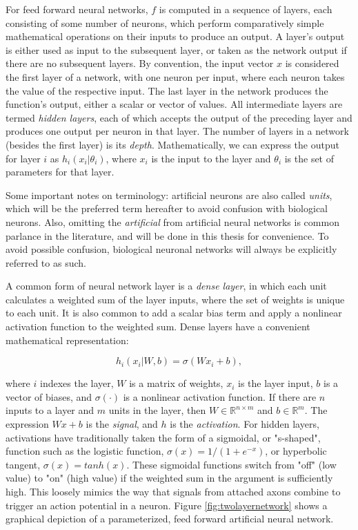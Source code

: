 For feed forward neural networks, $f$ is computed in a sequence of layers, each consisting of some number of neurons, which perform comparatively simple mathematical operations on their inputs to produce an output.
A layer's output is either used as input to the subsequent layer, or taken as the network output if there are no subsequent layers.
By convention, the input vector $x$ is considered the first layer of a network, with one neuron per input, where each neuron takes the value of the respective input.
The last layer in the network produces the function's output, either a scalar or vector of values.
All intermediate layers are termed \emph{hidden layers}, each of which accepts the output of the preceding layer and produces one output per neuron in that layer.
The number of layers in a network (besides the first layer) is its \emph{depth}.
Mathematically, we can express the output for layer $i$ as $h_i(x_i| \theta_i)$, where $x_i$ is the input to the layer and $\theta_i$ is the set of parameters for that layer.

Some important notes on terminology: artificial neurons are also called \emph{units}, which will be the preferred term hereafter to avoid confusion with biological neurons. Also, omitting the \emph{artificial} from artificial neural networks is common parlance in the literature, and will be done in this thesis for convenience. To avoid possible confusion, biological neuronal networks will always be explicitly referred to as such.

A common form of neural network layer is a \emph{dense layer}, in which each unit calculates a weighted sum of the layer inputs, where the set of weights is unique to each unit.
It is also common to add a scalar bias term and apply a nonlinear activation function to the weighted sum.
Dense layers have a convenient mathematical representation:

\begin{equation}
h_i(x_i|W, b)=\sigma(W x_i + b),
\label{eq:denselayer}
\end{equation}

\noindent
where $i$ indexes the layer, $W$ is a matrix of weights, $x_i$ is the layer input, $b$ is a vector of biases, and $\sigma(\cdot)$ is a nonlinear activation function.
If there are $n$ inputs to a layer and $m$ units in the layer, then $W\in\mathbb{R}^{n \times m}$ and $b\in\mathbb{R}^{m}$.
The expression $W x + b$ is the \emph{signal}, and $h$ is the \emph{activation}.
For hidden layers, activations have traditionally taken the form of a sigmoidal, or "s-shaped", function such as the logistic function, $\sigma(x) = 1/(1+e^{-x})$, or hyperbolic tangent, $\sigma(x) = tanh(x)$.
These sigmoidal functions switch from "off" (low value) to "on" (high value) if the weighted sum in the argument is sufficiently high.
This loosely mimics the way that signals from attached axons combine to trigger an action potential in a neuron.
Figure \ref{fig:twolayernetwork} shows a graphical depiction of a parameterized, feed forward artificial neural network.

